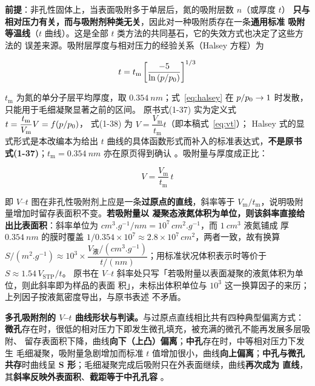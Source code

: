 \begin{principle}
\textbf{前提}：非孔性固体上，当表面吸附多于单层后，氮的吸附层数 $n$（或厚度 $t$）
\textbf{只与相对压力有关，而与吸附剂种类无关}，因此对一种吸附质存在一条\textbf{通用标准
吸附等温线}（$t$ 曲线）。这是全部 $t$ 类方法的共同基石，它的失效方式也决定了这些方法的
误差来源。吸附层厚度与相对压力的经验关系（Halsey 方程）为

\begin{equation}\label{eq:halsey}
t=t_{\mathrm{m}}\left[\frac{-5}{\ln\left(p/p_{0}\right)}\right]^{1/3}
\end{equation}

$t_{\mathrm{m}}$ 为氮的单分子层平均厚度，取 $\qty{0.354}{nm}$；式~\eqref{eq:halsey}
在 $p/p_{0}\to1$ 时发散，只能用于毛细凝聚显著之前的区间。
原书式(1-37) 实为定义式 $t=\dfrac{t_{\mathrm{m}}}{V_{\mathrm{m}}}V=f(p/p_{0})$，
式(1-38) 为 $V=\dfrac{V_{\mathrm{m}}}{t_{\mathrm{m}}}t$（即本稿式~\eqref{eq:vt}）；
Halsey 式的显式形式是本改编本为给出 $t$ 曲线的具体函数形式而补入的标准表达式，\textbf{不是原书
式(1-37)}；$t_{\mathrm{m}}=\qty{0.354}{nm}$ 亦在原页得到确认
。吸附量与厚度成正比：

\begin{equation}\label{eq:vt}
V=\frac{V_{\mathrm{m}}}{t_{\mathrm{m}}}\,t
\end{equation}

即 $V$--$t$ 图在非孔性吸附剂上应是一条\textbf{过原点的直线}，斜率等于
$V_{\mathrm{m}}/t_{\mathrm{m}}$，说明吸附量增加时留存表面积不变。\textbf{若吸附量以
凝聚态液氮体积为单位，则该斜率直接给出比表面积}：斜率单位为
$\unit{cm^3.g^{-1}}/\unit{nm}=10^{7}\,\unit{cm^2.g^{-1}}$，而 $\qty{1}{cm^3}$ 液氮铺成
厚 $\qty{0.354}{nm}$ 的膜时覆盖 $1/0.354\times10^{7}\approx2.8\times10^{7}\,
\unit{cm^2}$，两者一致，故有换算
$S/(\unit{m^2.g^{-1}})\approx10^{3}\times\dfrac{V_{\text{液}}/(\unit{cm^3.g^{-1}})}
{t/(\unit{nm})}$；用标准状况体积表示时等价于 $S\approx1.54\,V_{\mathrm{STP}}/t$。
原书在 $V$--$t$ 斜率处只写「若吸附量以表面凝聚的液氮体积为单位，则此斜率即为样品的表面
积」，未标出体积单位与 $10^{3}$ 这一换算因子的来历；上列因子按液氮密度导出，与原书表述
不矛盾。
\end{principle}

\textbf{多孔吸附剂的 $V$--$t$ 曲线形状与判读。}与过原点直线相比共有四种典型偏离方式：
\textbf{微孔}存在时，很低的相对压力下即发生微孔填充，被充满的微孔不能再发展多层吸附、
留存表面积下降，曲线\textbf{向下（上凸）偏离}；\textbf{中孔}存在时，中等相对压力下发生
毛细凝聚，吸附量急剧增加而标准 $t$ 值增加很小，曲线\textbf{向上偏离}；\textbf{中孔与微孔
共存}时曲线呈 \textbf{S 形}；毛细凝聚完成后吸附只在外表面继续，曲线\textbf{再次成为
直线}，其\textbf{斜率反映外表面积}、\textbf{截距等于中孔孔容}
。

